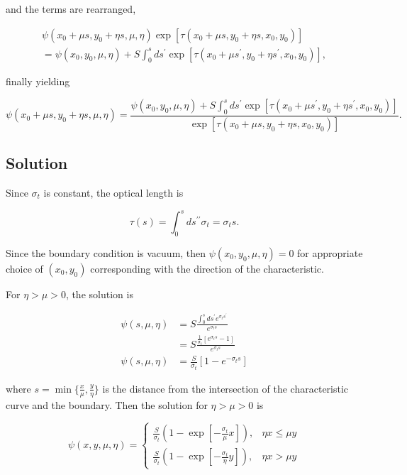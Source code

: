 \documentclass{midterm-template}
\begin{document}
and the terms are rearranged,

\begin{multline}
    \psi(x_0 + \mu s, y_0 + \eta s, \mu, \eta) \exp\left[ \tau(x_0+\mu s, y_0+ \eta s, x_0, y_0) \right] \\
    = \psi(x_0, y_0, \mu, \eta)  + S\int_0^s ds^\prime \exp\left[ \tau(x_0+\mu s^\prime, y_0+ \eta s^\prime, x_0, y_0) \right],
\end{multline}

finally yielding

\begin{equation}
    \psi(x_0 + \mu s, y_0 + \eta s, \mu, \eta)  = \frac{\psi(x_0, y_0, \mu, \eta)  + S\int_0^s ds^\prime \exp\left[ \tau(x_0+\mu s^\prime, y_0+ \eta s^\prime, x_0, y_0) \right]}{\exp\left[ \tau(x_0+\mu s, y_0+ \eta s, x_0, y_0) \right]}.
\end{equation}

\subsection{Solution}

Since $\sigma_t$ is constant, the optical length is 

\begin{equation}\label{eq:optical-length}
    \tau(s) = \int_0^s ds^{\prime\prime}\sigma_t = \sigma_t s.
\end{equation}

Since the boundary condition is vacuum, then $\psi(x_0, y_0, \mu, \eta) = 0$ for appropriate choice of $(x_0, y_0)$ corresponding with the direction of the characteristic.

For $\eta > \mu > 0$, the solution is

\begin{align}
    \psi(s, \mu, \eta) &= S\frac{\int_0^s ds^\prime e^{\sigma_t s^\prime}}{e^{\sigma_t s}}\\
     &= S \frac{\frac{1}{\sigma_t} \left[ e^{\sigma_t s} - 1 \right]}{e^{\sigma_t s}}\\
    \psi(s, \mu, \eta) &= \frac{S}{\sigma_t} \left[1 - e^{-\sigma_t s} \right]\label{eq:param-solution}
\end{align}

where $s = \min\{\frac{x}{\mu}, \frac{y}{\eta}\}$ is the distance from the intersection of the characteristic curve and the boundary. Then the solution for $\eta > \mu > 0$ is 

\begin{equation}
    \psi(x, y, \mu, \eta) = \begin{cases}
        \frac{S}{\sigma_t} \left(1 - \exp\left[-\frac{\sigma_t}{\mu} x  \right] \right), & \eta x \leq \mu y\\
        \frac{S}{\sigma_t} \left(1 - \exp\left[-\frac{\sigma_t}{\eta} y  \right] \right), & \eta x > \mu y
    \end{cases}
\end{equation}
\end{document}
